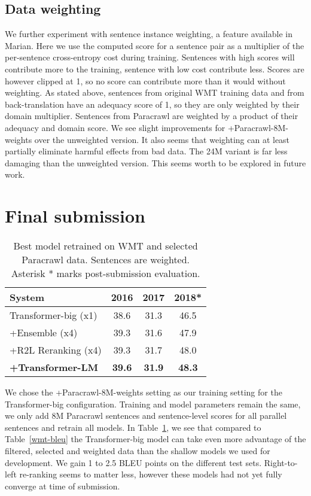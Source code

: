 \documentclass[11pt,a4paper]{article}
\begin{document}
\subsection{Data weighting}

We further experiment with sentence instance weighting, a feature available in Marian. Here we use the computed score for a sentence pair as a multiplier of the per-sentence cross-entropy cost during training. Sentences with high scores will contribute more to the training, sentence with low cost contribute less. Scores are however clipped at 1, so no score can contribute more than it would without weighting. As stated above, sentences from original WMT training data and from back-translation have an adequacy score of 1, so they are only weighted by their domain multiplier. Sentences from Paracrawl are weighted by a product of their adequacy and domain score. We see slight improvements for +Paracrawl-8M-weights over the unweighted version. It also seems that weighting can at least partially eliminate harmful effects from bad data. The 24M variant is far less damaging than the unweighted version. This seems worth to be explored in future work.

\section{Final submission}

\begin{table}[t]
  \centering
  \begin{tabular}{lccc}\toprule
  System &	2016 &	2017 & 2018* \\ \midrule
  Transformer-big (x1) & 38.6 & 31.3 & 46.5 \\
  +Ensemble (x4) & 39.3 & 31.6 & 47.9 \\ 
  +R2L Reranking (x4) & 39.3 & 31.7 & 48.0 \\ \midrule
  \bf +Transformer-LM & \bf 39.6 & \bf 31.9 & \bf 48.3 \\ 
  \bottomrule
  \end{tabular}
  \caption{Best model retrained on WMT and selected Paracrawl data. Sentences are weighted. Asterisk * marks post-submission evaluation.}
  \label{para-bleu}
  \end{table}

We chose the +Paracrawl-8M-weights setting as our training setting for the Transformer-big configuration. Training and model parameters remain the same, we only add 8M Paracrawl sentences and sentence-level scores for all parallel sentences and retrain all models. In Table~\ref{para-bleu}, we see that compared to Table~\ref{wmt-bleu} the Transformer-big model can take even more advantage of the filtered, selected and weighted data than the shallow models we used for development. We gain 1 to 2.5 BLEU points on the different test sets. Right-to-left re-ranking seems to matter less, however these models had not yet fully converge at time of submission. 
\end{document}
